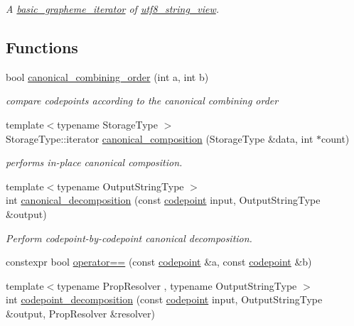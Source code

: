 \begin{DoxyCompactItemize}
\begin{DoxyCompactList}\small\item\em A \hyperlink{classu5e_1_1basic__grapheme__iterator}{basic\+\_\+grapheme\+\_\+iterator} of \hyperlink{classu5e_1_1utf8__string__view}{utf8\+\_\+string\+\_\+view}. \end{DoxyCompactList}\end{DoxyCompactItemize}
\subsection*{Functions}
\begin{DoxyCompactItemize}
\item 
bool \hyperlink{namespaceu5e_ab073e1177dd43954214d53300c11878b}{canonical\+\_\+combining\+\_\+order} (int a, int b)
\begin{DoxyCompactList}\small\item\em compare codepoints according to the canonical combining order \end{DoxyCompactList}\item 
{\footnotesize template$<$typename Storage\+Type $>$ }\\Storage\+Type\+::iterator \hyperlink{namespaceu5e_a81d3271854e997cb3cc056ccfb6b2530}{canonical\+\_\+composition} (Storage\+Type \&data, int $\ast$count)
\begin{DoxyCompactList}\small\item\em performs in-\/place canonical composition. \end{DoxyCompactList}\item 
{\footnotesize template$<$typename Output\+String\+Type $>$ }\\int \hyperlink{namespaceu5e_a73102e631813a8d4cafd7644de4b294a}{canonical\+\_\+decomposition} (const \hyperlink{classu5e_1_1codepoint}{codepoint} input, Output\+String\+Type \&output)
\begin{DoxyCompactList}\small\item\em Perform codepoint-\/by-\/codepoint canonical decomposition. \end{DoxyCompactList}\item 
constexpr bool \hyperlink{namespaceu5e_aae0975ab03c565571b3a521643b4fc86}{operator==} (const \hyperlink{classu5e_1_1codepoint}{codepoint} \&a, const \hyperlink{classu5e_1_1codepoint}{codepoint} \&b)
\item 
{\footnotesize template$<$typename Prop\+Resolver , typename Output\+String\+Type $>$ }\\int \hyperlink{namespaceu5e_a2040b81793be0aa54a2950cc7c6d580c}{codepoint\+\_\+decomposition} (const \hyperlink{classu5e_1_1codepoint}{codepoint} input, Output\+String\+Type \&output, Prop\+Resolver \&resolver)

\end{DoxyCompactItemize}
